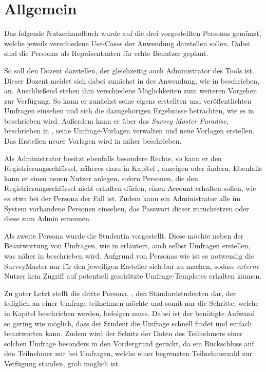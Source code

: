 
\section{Allgemein}

Das folgende Nutzerhandbuch wurde auf die drei vorgestellten Personas gemünzt, welche jeweils verschiedene Use-Cases der Anwendung darstellen sollen.
Dabei sind die Personas als Repräsentanten für echte Benutzer geplant.

So soll \dutzi den Dozent darstellen, der gleichzeitig auch Administrator des Tools ist.
Dieser Dozent meldet sich dabei zunächst in der Anwendung, wie in  beschrieben, an.
Anschließend stehen ihm verschiedene Möglichkeiten zum weiteren Vorgehen zur Verfügung.
So kann er zunächst seine eigens erstellten und veröffentlichten Umfragen einsehen und sich die dazugehörigen Ergebnisse betrachten, wie es in  beschrieben wird.
Außerdem kann er über das \emph{Survey Master Paradise}, beschrieben in , seine Umfrage-Vorlagen verwalten und neue Vorlagen erstellen.
Das Erstellen neuer Vorlagen wird in  näher beschrieben.

Als Administrator besitzt \dutzi ebenfalls besondere Rechte, so kann er den Registrierungsschlüssel, näheres dazu in Kapitel , anzeigen oder ändern.
Ebenfalls kann er einen neuen Nutzer anlegen, sofern Personen, die den Registrierungsschlüssel nicht erhalten dürfen, einen Account erhalten sollen, wie es etwa bei der Persona \ariane der Fall ist. 
Zudem kann ein Administrator alle im System vorhandene Personen einsehen, das Passwort dieser zurücksetzen oder diese zum Admin ernennen.

Als zweite Persona wurde die Studentin \ariane vorgestellt.
Diese möchte neben der Beantwortung von Umfragen, wie in  erläutert, auch selbst Umfragen erstellen, was näher in  beschrieben wird.
Aufgrund von Personas wie \ariane ist es notwendig die SurveyMaster nur für den jeweiligen Ersteller sichtbar zu machen, sodass \textit{externe} Nutzer kein Zugriff auf potentiell geschützte Umfrage-Templates erhalten können.

Zu guter Letzt stellt die dritte Persona, \weigert, den Standardstudenten dar, der lediglich an einer Umfrage teilnehmen möchte und somit nur die Schritte, welche in Kapitel  beschrieben werden, befolgen muss.
Dabei ist der benötigte Aufwand so gering wie möglich, dass der Student die Umfrage schnell findet und einfach beantworten kann.
Zudem wird der Schutz der Daten des Teilnehmers einer solchen Umfrage besonders in den Vordergrund gerückt, da ein Rückschluss auf den Teilnehmer nur bei Umfragen, welche einer begrenzten Teilnehmerzahl zur Verfügung standen, grob möglich ist.

